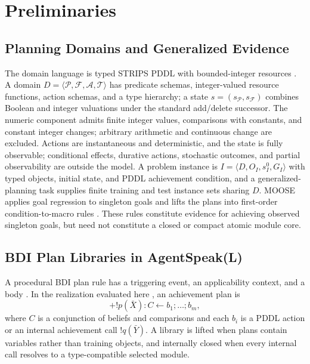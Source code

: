 \section{Preliminaries}
\label{sec:background}

\subsection{Planning Domains and Generalized Evidence}

The domain language is typed STRIPS PDDL with bounded-integer resources
\cite{FikesNilsson1971STRIPS,McDermott1998PDDL,FoxLong2003PDDL21}. A domain
$D=\langle\mathcal{P},\mathcal{F},\mathcal{A},\mathcal{T}\rangle$ has predicate
schemas, integer-valued resource functions, action schemas, and a type
hierarchy; a state $s=(s_{\mathcal P},s_{\mathcal F})$ combines Boolean and
integer valuations under the standard add/delete successor. The numeric
component admits finite integer values, comparisons with constants, and
constant integer changes; arbitrary arithmetic and continuous change are
excluded. Actions are instantaneous and deterministic, and the state is fully
observable; conditional effects, durative actions, stochastic outcomes, and
partial observability are outside the model. A problem instance is
$I=\langle D,O_I,s_I^0,G_I\rangle$ with typed
objects, initial state, and PDDL achievement condition, and a
generalized-planning task supplies finite training and test instance sets
sharing $D$. MOOSE applies goal regression
\cite{Fikes1972GeneralizedRobotPlans,Alcazar2013Regression} to singleton goals
and lifts the plans into first-order condition-to-macro rules
\cite{Chen2026Moose}. These rules constitute evidence for achieving observed
singleton goals, but need not constitute a closed or
compact atomic module core.

\subsection{BDI Plan Libraries in AgentSpeak(L)}

A procedural BDI plan rule has a triggering event, an applicability context,
and a body \cite{MeneguzziDeSilva2015PlanningBDI}. In the \asl{} realization
evaluated here \cite{Rao1996AgentSpeak}, an achievement plan is
\[
+!p(\bar X):C\leftarrow b_1;\ldots;b_m,
\]
where $C$ is a conjunction of beliefs and comparisons and each $b_i$ is a PDDL
action or an internal achievement call $!q(\bar Y)$. A library is lifted when
plans contain variables rather than training objects, and internally closed
when every internal call resolves to a type-compatible selected module.

